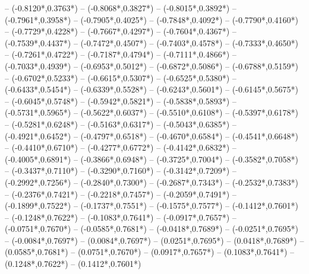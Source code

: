 {	-- ({-0.8120*\dx},{0.3763*\dy})
	-- ({-0.8068*\dx},{0.3827*\dy})
	-- ({-0.8015*\dx},{0.3892*\dy})
	-- ({-0.7961*\dx},{0.3958*\dy})
	-- ({-0.7905*\dx},{0.4025*\dy})
	-- ({-0.7848*\dx},{0.4092*\dy})
	-- ({-0.7790*\dx},{0.4160*\dy})
	-- ({-0.7729*\dx},{0.4228*\dy})
	-- ({-0.7667*\dx},{0.4297*\dy})
	-- ({-0.7604*\dx},{0.4367*\dy})
	-- ({-0.7539*\dx},{0.4437*\dy})
	-- ({-0.7472*\dx},{0.4507*\dy})
	-- ({-0.7403*\dx},{0.4578*\dy})
	-- ({-0.7333*\dx},{0.4650*\dy})
	-- ({-0.7261*\dx},{0.4722*\dy})
	-- ({-0.7187*\dx},{0.4794*\dy})
	-- ({-0.7111*\dx},{0.4866*\dy})
	-- ({-0.7033*\dx},{0.4939*\dy})
	-- ({-0.6953*\dx},{0.5012*\dy})
	-- ({-0.6872*\dx},{0.5086*\dy})
	-- ({-0.6788*\dx},{0.5159*\dy})
	-- ({-0.6702*\dx},{0.5233*\dy})
	-- ({-0.6615*\dx},{0.5307*\dy})
	-- ({-0.6525*\dx},{0.5380*\dy})
	-- ({-0.6433*\dx},{0.5454*\dy})
	-- ({-0.6339*\dx},{0.5528*\dy})
	-- ({-0.6243*\dx},{0.5601*\dy})
	-- ({-0.6145*\dx},{0.5675*\dy})
	-- ({-0.6045*\dx},{0.5748*\dy})
	-- ({-0.5942*\dx},{0.5821*\dy})
	-- ({-0.5838*\dx},{0.5893*\dy})
	-- ({-0.5731*\dx},{0.5965*\dy})
	-- ({-0.5622*\dx},{0.6037*\dy})
	-- ({-0.5510*\dx},{0.6108*\dy})
	-- ({-0.5397*\dx},{0.6178*\dy})
	-- ({-0.5281*\dx},{0.6248*\dy})
	-- ({-0.5163*\dx},{0.6317*\dy})
	-- ({-0.5043*\dx},{0.6385*\dy})
	-- ({-0.4921*\dx},{0.6452*\dy})
	-- ({-0.4797*\dx},{0.6518*\dy})
	-- ({-0.4670*\dx},{0.6584*\dy})
	-- ({-0.4541*\dx},{0.6648*\dy})
	-- ({-0.4410*\dx},{0.6710*\dy})
	-- ({-0.4277*\dx},{0.6772*\dy})
	-- ({-0.4142*\dx},{0.6832*\dy})
	-- ({-0.4005*\dx},{0.6891*\dy})
	-- ({-0.3866*\dx},{0.6948*\dy})
	-- ({-0.3725*\dx},{0.7004*\dy})
	-- ({-0.3582*\dx},{0.7058*\dy})
	-- ({-0.3437*\dx},{0.7110*\dy})
	-- ({-0.3290*\dx},{0.7160*\dy})
	-- ({-0.3142*\dx},{0.7209*\dy})
	-- ({-0.2992*\dx},{0.7256*\dy})
	-- ({-0.2840*\dx},{0.7300*\dy})
	-- ({-0.2687*\dx},{0.7343*\dy})
	-- ({-0.2532*\dx},{0.7383*\dy})
	-- ({-0.2376*\dx},{0.7421*\dy})
	-- ({-0.2218*\dx},{0.7457*\dy})
	-- ({-0.2059*\dx},{0.7491*\dy})
	-- ({-0.1899*\dx},{0.7522*\dy})
	-- ({-0.1737*\dx},{0.7551*\dy})
	-- ({-0.1575*\dx},{0.7577*\dy})
	-- ({-0.1412*\dx},{0.7601*\dy})
	-- ({-0.1248*\dx},{0.7622*\dy})
	-- ({-0.1083*\dx},{0.7641*\dy})
	-- ({-0.0917*\dx},{0.7657*\dy})
	-- ({-0.0751*\dx},{0.7670*\dy})
	-- ({-0.0585*\dx},{0.7681*\dy})
	-- ({-0.0418*\dx},{0.7689*\dy})
	-- ({-0.0251*\dx},{0.7695*\dy})
	-- ({-0.0084*\dx},{0.7697*\dy})
	-- ({0.0084*\dx},{0.7697*\dy})
	-- ({0.0251*\dx},{0.7695*\dy})
	-- ({0.0418*\dx},{0.7689*\dy})
	-- ({0.0585*\dx},{0.7681*\dy})
	-- ({0.0751*\dx},{0.7670*\dy})
	-- ({0.0917*\dx},{0.7657*\dy})
	-- ({0.1083*\dx},{0.7641*\dy})
	-- ({0.1248*\dx},{0.7622*\dy})
	-- ({0.1412*\dx},{0.7601*\dy})
}
